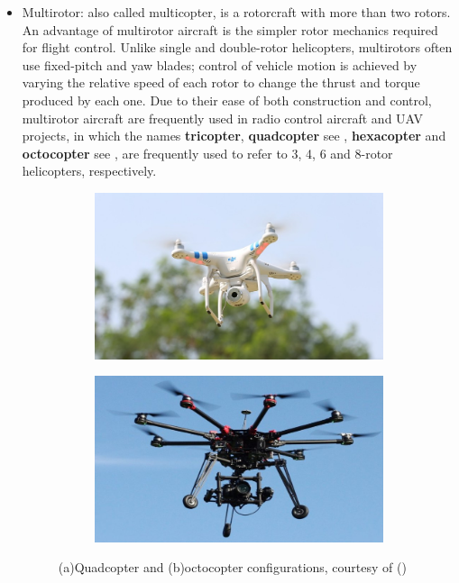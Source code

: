 \begin{itemize}
  \item Multirotor: also called multicopter, is a rotorcraft with more than two rotors. An advantage of multirotor aircraft  is the simpler rotor mechanics required for flight control. Unlike single and double-rotor helicopters, multirotors often use fixed-pitch and yaw blades; control of vehicle motion is achieved by varying the relative speed of each rotor to change the thrust and torque produced by each one. Due to their ease of both construction and control, multirotor aircraft are frequently used in radio control aircraft and UAV projects, in which the names \textbf{tricopter}, \textbf{quadcopter} see , \textbf{hexacopter} and \textbf{octocopter} see , are frequently used to refer to 3, 4, 6 and 8-rotor helicopters, respectively.
%
  \begin{figure} [h!]
\centering
\begin{subfigure}[t]{0.45\textwidth}
\includegraphics[width = \textwidth]{figures/quaddji.png}
\caption{}
\label{fig:quaddji}
\end{subfigure}
\begin{subfigure}[t]{0.45\textwidth}
\includegraphics[width = \textwidth]{figures/octodji.jpg}
\caption{}
\label{fig:octodji}
\end{subfigure}
\caption{(a)Quadcopter and (b)octocopter configurations, courtesy of (\cite{website:dji})}
  \label{fig:multirotor}
\end{figure}


\end{itemize}
